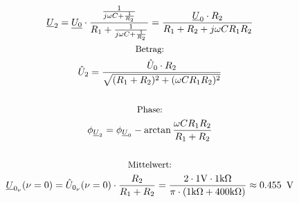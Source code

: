 \documentclass[a4paper, 12pt]{article}
\begin{document}
    \begin{gather*}
      \underline{U}_2 = \underline{U_0} \cdot \dfrac{ \frac{1}{ j \omega C + \frac{1}{R_2} }  }{ R_1 + \frac{1}{ j \omega C + \frac{1}{R_2} } } = \frac{\underline{U}_0 \cdot R_2}{R_1+R_2+ j \omega C R_1 R_2}\\
      \text{\small Betrag:}\\
      \hat{U}_2 = \frac{\hat{U}_0 \cdot R_2}{\sqrt{(R_1+R_2)^2 + (\omega C R_1 R_2)^2}}\\\\
      \text{\small Phase:}\\
      \phi_{\underline{U}_2} = \phi_{\underline{U}_0} - \arctan{ \frac{\omega C R_1 R_2}{R_1+R_2} }\\\\
      \text{\small Mittelwert:}\\
      \underline{U}_{0_\nu} (\nu = 0) = \hat{U}_{0_\nu}(\nu=0) \cdot \frac{R_2}{R_1+R_2} = \frac{2 \cdot 1 \si{\volt}\cdot 1\si{\kilo\ohm}}{\pi\cdot(1\si{\kilo\ohm}+400\si{\kilo\ohm})} \approx 0.455 \,\ \si{\volt}
    \end{gather*}
\end{document}
